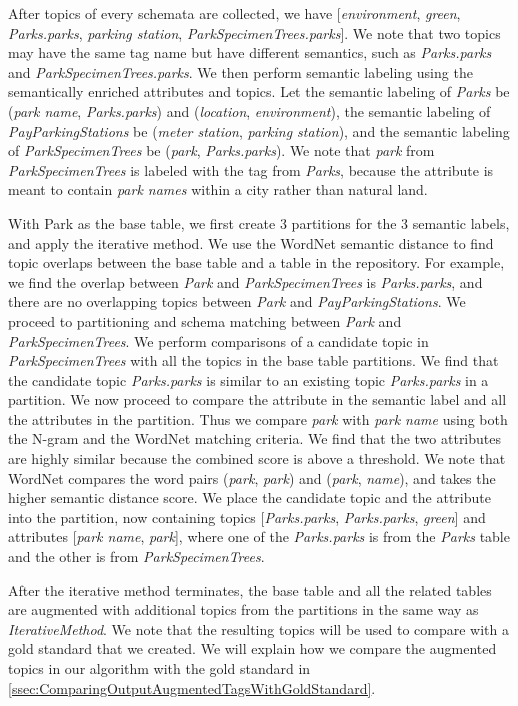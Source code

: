 After topics of every schemata are collected, we have [\textit{environment}, \textit{green}, \textit{Parks.parks}, \textit{parking station}, \textit{ParkSpecimenTrees.parks}]. We note that two topics may have the same tag name but have different semantics, such as \textit{Parks.parks} and \textit{ParkSpecimenTrees.parks}. We then perform semantic labeling using the semantically enriched attributes and topics. Let the semantic labeling of \textit{Parks} be (\textit{park name}, \textit{Parks.parks}) and (\textit{location}, \textit{environment}), the semantic labeling of \textit{PayParkingStations} be (\textit{meter station}, \textit{parking station}), and the semantic labeling of \textit{ParkSpecimenTrees} be (\textit{park}, \textit{Parks.parks}). We note that \textit{park} from \textit{ParkSpecimenTrees} is labeled with the tag from \textit{Parks}, because the attribute is meant to contain \textit{park names} within a city rather than natural land.

With Park as the base table, we first create 3 partitions for the 3 semantic labels, and apply the iterative method. We use the WordNet semantic distance to find topic overlaps between the base table and a table in the repository. For example, we find the overlap between \textit{Park} and \textit{ParkSpecimenTrees} is \textit{Parks.parks}, and there are no overlapping topics between \textit{Park} and \textit{PayParkingStations}. We proceed to partitioning and schema matching between \textit{Park} and \textit{ParkSpecimenTrees}. We perform comparisons of a candidate topic in \textit{ParkSpecimenTrees} with all the topics in the base table partitions. We find that the candidate topic \textit{Parks.parks} is similar to an existing topic \textit{Parks.parks} in a partition. We now proceed to compare the attribute in the semantic label and all the attributes in the partition. Thus we compare \textit{park} with \textit{park name} using both the N-gram and the WordNet matching criteria. We find that the two attributes are highly similar because the combined score is above a threshold. We note that WordNet compares the word pairs (\textit{park}, \textit{park}) and (\textit{park}, \textit{name}), and takes the higher semantic distance score. We place the candidate topic and the attribute into the partition, now containing topics [\textit{Parks.parks}, \textit{Parks.parks}, \textit{green}] and attributes [\textit{park name}, \textit{park}], where one of the \textit{Parks.parks} is from the \textit{Parks} table and the other is from \textit{ParkSpecimenTrees}.

After the iterative method terminates, the base table and all the related tables are augmented with additional topics from the partitions in the same way as \textit{IterativeMethod}. We note that the resulting topics will be used to compare with a gold standard that we created. We will explain how we compare the augmented topics in our algorithm with the gold standard in \autoref{ssec:ComparingOutputAugmentedTagsWithGoldStandard}.
\endinput